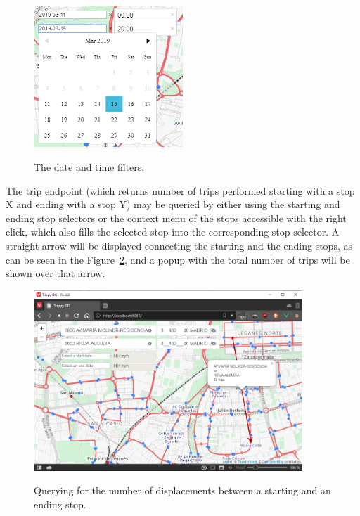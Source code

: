 	\begin{figure}[ht]
		\begin{center}
			{\includegraphics[width=0.5\textwidth]{screens/date_cut.png}}
		\end{center}
		\caption{The date and time filters.}
		\label{fig:ui:date}
	\end{figure}
	
	The trip endpoint (which returns number of trips performed starting with a stop X and ending with a stop Y) may be queried by either using the starting and ending stop selectors or the context menu of the stops accessible with the right click, which also fills the selected stop into the corresponding stop selector. A straight arrow will be displayed connecting the starting and the ending stops, as can be seen in the Figure~\ref{fig:ui:xy}, and a popup with the total number of trips will be shown over that arrow.
	
	\begin{figure}[ht]
		\begin{center}
			{\includegraphics[width=0.9\textwidth]{screens/xy.png}}
		\end{center}
		\caption{Querying for the number of displacements between a starting and an ending stop.}
		\label{fig:ui:xy}
	\end{figure}
	
